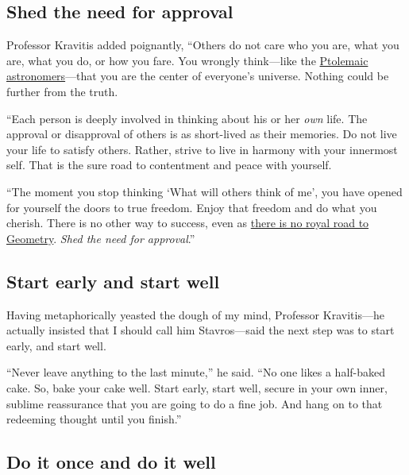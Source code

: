 \documentclass[
  a4paper,
]{article}
\begin{document}
\hypertarget{shed-the-need-for-approval}{%
\subsection{Shed the need for
approval}\label{shed-the-need-for-approval}}

Professor Kravitis added poignantly, ``Others do not care who you are,
what you are, what you do, or how you fare. You wrongly think---like the
\href{https://www.princeton.edu/~hos/mike/texts/ptolemy/ptolemy.html}{Ptolemaic
astronomers}---that you are the center of everyone's universe. Nothing
could be further from the truth.

``Each person is deeply involved in thinking about his or her \emph{own}
life. The approval or disapproval of others is as short-lived as their
memories. Do not live your life to satisfy others. Rather, strive to
live in harmony with your innermost self. That is the sure road to
contentment and peace with yourself.

``The moment you stop thinking `What will others think of me', you have
opened for yourself the doors to true freedom. Enjoy that freedom and do
what you cherish. There is no other way to success, even as
\href{https://idioms.thefreedictionary.com/royal+road+to}{there is no
royal road to Geometry}. \emph{Shed the need for approval}.''

\hypertarget{start-early-and-start-well}{%
\subsection{Start early and start
well}\label{start-early-and-start-well}}

Having metaphorically yeasted the dough of my mind, Professor
Kravitis---he actually insisted that I should call him Stavros---said
the next step was to start early, and start well.

``Never leave anything to the last minute,'' he said. ``No one likes a
half-baked cake. So, bake your cake well. Start early, start well,
secure in your own inner, sublime reassurance that you are going to do a
fine job. And hang on to that redeeming thought until you finish.''

\hypertarget{do-it-once-and-do-it-well}{%
\subsection{Do it once and do it well}\label{do-it-once-and-do-it-well}}
\end{document}
